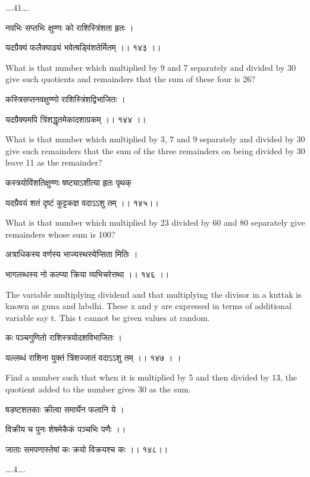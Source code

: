 \documentclass[]{article}
\date{}
\begin{document}
{\ldots{}.41\ldots{}.}

{नवभिः सप्तभिः क्षुण्णः को राशिस्त्रिंशता हृतः । }

{यदग्रैक्यं फलैक्याढ्यं भवेत्षड्विंशतेर्मितम् ।। १४३ ।। }

{What is that number which multiplied by 9 and 7 separately and divided
by 30 give such quotients and remainders that the sum of these four is
26?}

{कस्त्रिसप्तनवक्षुण्णो राशिस्त्रिंशद्विभाजितः । }

{यदग्रैक्यमपि त्रिंशद्धृतमेकादशाग्रकम् ।। १४४ ।। }

{What is that number which multiplied by 3, 7 and 9 separately and
divided by 30 give such remainders that the sum of the three remainders
on being divided by 30 leave 11 as the remainder?}

{कस्त्रयोविंशतिक्षुण्णः षष्ट्याऽशीत्या हृतः पृथक् }

{यदग्रैवयं शतं दृष्टं कुट्टकज्ञ वदाऽऽशु तम् ।। १४५।। }

{What is that number which multiplied by 23 divided by 60 and 80
separately give remainders whose sum is 100?}

{अत्राधिकस्य वर्णस्य भाज्यस्थस्येप्सिता मितिः । }

{भागलब्धस्य नो कल्प्या क्रिया व्यभिचरेत्तथा ।। १४६ ।। }

{The variable multiplying dividend and that multiplying the divisor in a
kuttak is known as guna and labdhi. These x and y are expressed in terms
of additional variable say t. This t cannot be given values at random. }

{कः पञ्चगुणितो राशिस्त्रयोदशविभाजितः । }

{यल्लब्धं राशिना युक्तं त्रिंशज्जातं वदाऽऽशु तम् ।। १४७ । । }

{Find a number such that when it is multiplied by 5 and then divided by
13, the quotient added to the number gives 30 as the sum.}

{षडष्टशतकाः क्रीत्वा समार्घेन फलानि ये । }

{विक्रीय च पुनः शेषमेकैकं पञ्चभिः पणैः ।। }

{जाताः समपणास्तेषां कः क्रयो विक्रयश्च कः ।। १४८।।}

{\ldots{}.4\ldots{}.\\
}
\end{document}
